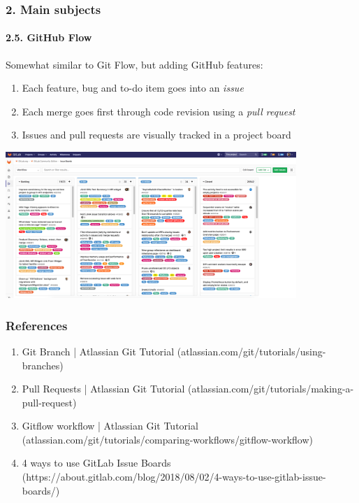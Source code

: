 \documentclass[dvipsnames]{beamer}
\begin{document}
\begin{frame}
\frametitle{2. Main subjects}
\framesubtitle{2.5. GitHub Flow}

\scriptsize

Somewhat similar to Git Flow, but adding GitHub features:

\begin{enumerate}
  \item Each feature, bug and to-do item goes into an \textit{issue}
  \item Each merge goes first through code revision using a \textit{pull request}
  \item Issues and pull requests are visually tracked in a project board
\end{enumerate}

\begin{center}
  \includegraphics[width=110mm]{img/board}
\end{center}

\end{frame}

\begin{frame}
  \frametitle{References}
  \begin{enumerate}
    \item Git Branch | Atlassian Git Tutorial ({\footnotesize atlassian.com/git/tutorials/using-branches})
    \item Pull Requests | Atlassian Git Tutorial ({\footnotesize atlassian.com/git/tutorials/making-a-pull-request})
    \item Gitflow workflow | Atlassian Git Tutorial ({\footnotesize atlassian.com/git/tutorials/comparing-workflows/gitflow-workflow})
    \item 4 ways to use GitLab Issue Boards ({\footnotesize https://about.gitlab.com/blog/2018/08/02/4-ways-to-use-gitlab-issue-boards/})
  \end{enumerate}
\end{frame}
\end{document}
